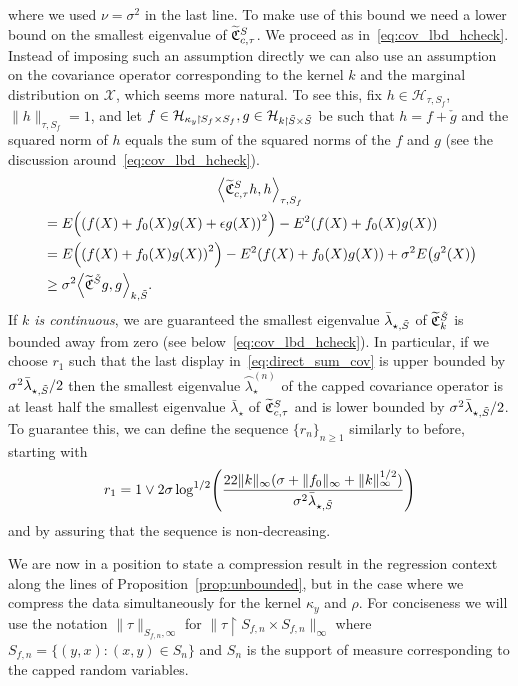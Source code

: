 \documentclass[10pt]{amsart}
\theoremstyle{definition}\newtheorem{defi}[theo]{Definition}\newtheorem{rema}[theo]{Remark}\newtheorem{exam}[theo]{Example}\newtheorem{exem}[theo]{Example}\newtheorem{nota}[theo]{Notation}
\theoremstyle{remark}
\newcommand{\restrr}
{\!\!\upharpoonright\!\!}
\newcommand{\X}{\mathcal{X}}
\newcommand{\cH}{\mathcal{H}}
\newcommand{\fkC}{\mathfrak{C}}
\newcommand{\Cov}{\tilde{\fkC}}
\newcommand*{\mk}{\mkern -1mu}
\let\oldtilde\tilde
\renewcommand*{\tilde}[1]{\mathchoice{\widetilde{#1}}{\widetilde{#1}}{\oldtilde{#1}}{\oldtilde{#1}}}
\let\originalleft\left
\let\originalright\right
\renewcommand{\left}{\mathopen{}\mathclose\bgroup\originalleft}
\renewcommand{\right}{\aftergroup\egroup\originalright}
\begin{document}
where we used $\nu = \sigma^2$ in the last line. To make use of this bound we need a lower bound on the smallest eigenvalue of $\Cov_{c,\tau}^S$. We proceed as in~\eqref{eq:cov_lbd_hcheck}. Instead of imposing such an assumption directly we can also use an assumption on the covariance operator corresponding to the kernel $k$ and the marginal distribution on $\X$, which seems more natural. To see this, fix $h \in \cH_{\tau,S_f}$, $\|h\|_{\tau,S_f} = 1$, and let $f \in \cH_{\kappa_y\mk\upharpoonright\mk S_f \times S_f}, g \in \cH_{k \mk\upharpoonright\mk \tilde S \times \tilde S}$ be such that $h = f + \check{g}$ and the squared norm of $h$ equals the sum of the squared norms of the $f$ and $g$ (see the discussion around~\eqref{eq:cov_lbd_hcheck}).
\begin{multline*}
\left\langle \Cov_{c,\tau}^S h, h \right\rangle_{\tau,S_f}\\
\begin{aligned}
&= E\left(\left(f(X) + f_0(X) g(X) + \epsilon g(X)\right)^2\right) - E^2(f(X) + f_0(X) g(X)) \\
&= E\left(\left(f(X) + f_0(X) g(X)\right)^2\right) - E^2(f(X) + f_0(X) g(X)) + \sigma^2 E\left(g^2(X)\right) \\
&\geq \sigma^2 \left\langle \Cov^{\tilde S} g, g \right\rangle_{k,\tilde S}.
\end{aligned}
\end{multline*}
If \emph{$k$ is continuous}, we are guaranteed the smallest eigenvalue $\bar \lambda_{\star,\tilde S}$ of $\Cov^{\tilde S}_k$ is bounded away from zero (see below~\eqref{eq:cov_lbd_hcheck}). In particular, if we choose $r_1$ such that the last display in~\eqref{eq:direct_sum_cov} is upper bounded by $ \sigma^2 \bar \lambda_{\star,\tilde S}/ 2$ then the smallest eigenvalue $\wideparen \lambda_{\star}^{(n)}$ of the capped covariance operator is at least half the smallest eigenvalue $\bar \lambda_\star$ of $\Cov_{c,\tau}^S$ and is lower bounded by $\sigma^2 \bar \lambda_{\star,\tilde S}/2$. To guarantee this, we can define the sequence $\{r_n\}_{n\geq 1}$ similarly to before, starting with
\begin{equation}\label{def:r1_regression}
r_1 = 1 \vee 2 \sigma \log^{1/2}\left(\frac{22 \|k\|_\infty (\sigma + \|f_0\|_\infty + \|k\|_\infty^{1/2}) }{\sigma^2 \bar \lambda_{\star,\tilde S}}
\right)
\end{equation}
and by assuring that the sequence is non-decreasing.


We are now in a position to state a compression result in the regression context along the lines of Proposition~\ref{prop:unbounded}, but in the case where we compress the data simultaneously for the kernel $\kappa_y$ and $\rho$. For conciseness we will use the notation $\|\tau\|_{S_{f,n},\infty}$ for $\|\tau \restrr S_{f,n} \times S_{f,n} \|_\infty$ where $S_{f,n} = \{ (y,x) : (x,y) \in S_n\}$ and $S_n$ is the support of measure corresponding to the capped random variables.
\end{document}
